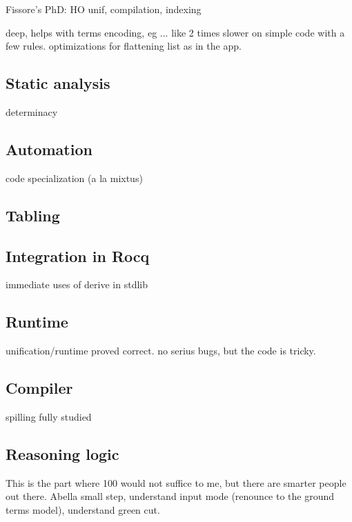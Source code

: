 \documentclass[a4paper, 11pt]{book}
\begin{document}
Fissore's PhD: HO unif, compilation, indexing

deep, helps with terms encoding, eg ...
like 2 times slower on simple code with a few rules.
optimizations for flattening list as in the app.


\subsection{Static analysis}


determinacy

\subsection{Automation}

code specialization (a la mixtus)

\subsection{Tabling}

\cite{selsam2020tabledtypeclassresolution}

\subsection{Integration in Rocq}

immediate uses of derive in stdlib

\subsection{Runtime}

unification/runtime proved correct.
no serius bugs, but the code is tricky.

\subsection{Compiler}

spilling fully studied

\subsection{Reasoning logic}

This is the part where 100 would not suffice to me, but there are smarter people out there.
Abella small step, understand input mode (renounce to the ground terms model),
understand green cut.




\nocite{*}
\printbibliography[title={Our Bibliography}, keyword=me]
\printbibliography[title={Bibliography}, keyword=they]
\end{document}
